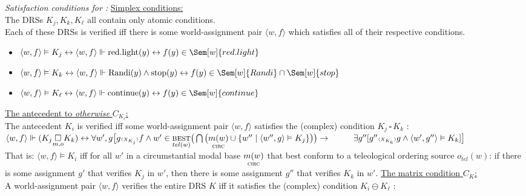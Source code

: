 \pex \textit{Satisfaction conditions for \blastx:}
\a\uline{Simplex conditions:}\\ 
The DRSs $ K_j,K_k,K_\ell $ all contain only atomic conditions.\\ Each of these DRSs is verified iff there is some world-assignment pair $ \langle w,f\rangle $ which satisfies all of their respective conditions.\\
\begin{itemize}
	\item  $\langle w,f\rangle \vDash K_j \leftrightarrow \langle w,f\rangle \Vdash \text{red.light}(y) \leftrightarrow f(y)\in\Sem[w]{red.light}$\\
	\item   $\langle w,f\rangle \vDash K_k \leftrightarrow \langle w,f\rangle \Vdash \text{Randi}(y)\wedge \text{stop}(y) \leftrightarrow f(y)\in\Sem[w]{Randi}\cap\Sem[w]{stop}$\\
	\item   $\langle w,f\rangle \vDash K_\ell \leftrightarrow \langle w,f\rangle \Vdash \text{continue}(y) \leftrightarrow f(y)\in\Sem[w]{continue}$
\end{itemize}
\a \uline{The antecedent to \textit{otherwise} $ C_{K_i} $:}\\
The antecedent $ K_i $ is verified iff some world-assignment pair $ \langle w,f\rangle $ satisfies the (complex) condition $ K_j\,\square\,K_k $ :\\ 
%
$\langle w,f\rangle\Vdash (K_j\underset{m,o}{\square} K_k )\leftrightarrow \\
  	\forall w',g\big[g{\scriptscriptstyle\langle X_{K_j}\rangle}f \wedge w'\in\underset{tel(w)}{\textsc{best}}\big(\bigcap\big(\underset{\textsc{circ}}{m(w)}\cup\{w''\mid\langle w'',g\rangle\vDash K_j\}\big)\big) \to\\
	\hspace*{2.7em} \exists g''[g''{\scriptscriptstyle\langle X_{K_k}\rangle}g \wedge \langle w',g''\rangle\vDash K_k]\big]$\\[1em]
%
That is: $ \langle w,f\rangle\vDash K_i $ iff for all $ w' $ in a circumstantial modal base $ \underset{\textsc{circ}}{m(w)} $ that best conform to a teleological ordering source $ o_{tel}(w) $: if there is some assignment $g'$ that verifies $ K_j $ in $w'$, then there is some assignment $ g'' $ that verifies $ K_k $  in $w'$.
\a \uline{The matrix condition $ C_K $:}\\
A world-assignment pair $\langle  w,f \rangle$ verifies the entire DRS $ K $ iff it satisfies the (complex) condition $ K_i\ominus K_\ell $ : 
